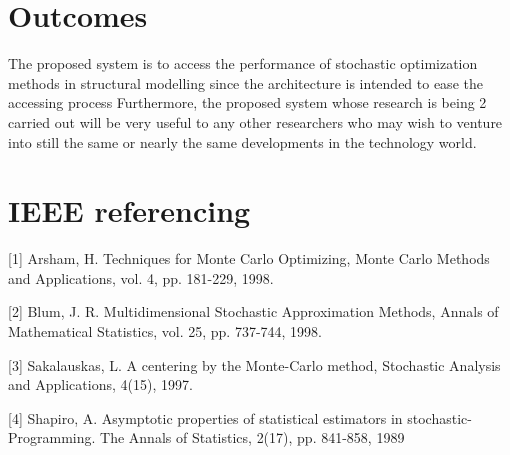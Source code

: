 \documentclass[11pt,a4paper]{article}
\begin{document}
\section{Outcomes}
The proposed system is to access the performance of stochastic optimization
methods in structural modelling since the architecture is intended to ease the
accessing process Furthermore, the proposed system whose research is being
2
carried out will be very useful to any other researchers who may wish to
venture into still the same or nearly the same developments in the technology
world.


\section{IEEE referencing}
 [1] 	Arsham, H. Techniques for Monte Carlo Optimizing, Monte Carlo
    Methods and Applications, vol. 4, pp. 181-229, 1998.

[2] 	Blum, J. R. Multidimensional Stochastic Approximation Methods, Annals of            Mathematical Statistics, vol. 25, pp. 737-744, 1998.

[3]	Sakalauskas, L. A centering by the Monte-Carlo method, Stochastic
Analysis and Applications, 4(15), 1997.

[4]	Shapiro, A. Asymptotic properties of statistical estimators in stochastic-
 Programming. The Annals of Statistics, 2(17), pp. 841-858, 1989
\end{document}
